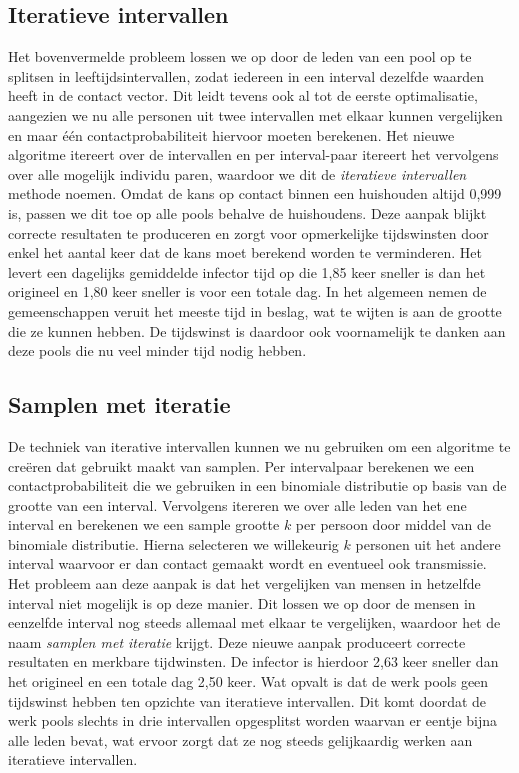 \begin{appendices}
\subsection{Iteratieve intervallen}
Het bovenvermelde probleem lossen we op door de leden van een pool op te splitsen in leeftijdsintervallen, zodat iedereen in een interval dezelfde waarden heeft in de contact vector. Dit leidt tevens ook al tot de eerste optimalisatie, aangezien we nu alle personen uit twee intervallen met elkaar kunnen vergelijken en maar één contactprobabiliteit hiervoor moeten berekenen. Het nieuwe algoritme itereert over de intervallen en per interval-paar itereert het vervolgens over alle mogelijk individu paren, waardoor we dit de \textit{iteratieve intervallen} methode noemen. Omdat de kans op contact binnen een huishouden altijd 0,999 is, passen we dit toe op alle pools behalve de huishoudens. Deze aanpak blijkt correcte resultaten te produceren en zorgt voor opmerkelijke tijdswinsten door enkel het aantal keer dat de kans moet berekend worden te verminderen. Het levert een dagelijks gemiddelde infector tijd op die 1,85 keer sneller is dan het origineel en 1,80 keer sneller is voor een totale dag. In het algemeen nemen de gemeenschappen veruit het meeste tijd in beslag, wat te wijten is aan de grootte die ze kunnen hebben. De tijdswinst is daardoor ook voornamelijk te danken aan deze pools die nu veel minder tijd nodig hebben.

\subsection{Samplen met iteratie}
De techniek van iterative intervallen kunnen we nu gebruiken om een algoritme te creëren dat gebruikt maakt van samplen. Per intervalpaar berekenen we een contactprobabiliteit die we gebruiken in een binomiale distributie op basis van de grootte van een interval. Vervolgens itereren we over alle leden van het ene interval en berekenen we een sample grootte $k$ per persoon door middel van de binomiale distributie. Hierna selecteren we willekeurig $k$ personen uit het andere interval waarvoor er dan contact gemaakt wordt en eventueel ook transmissie. Het probleem aan deze aanpak is dat het vergelijken van mensen in hetzelfde interval niet mogelijk is op deze manier. Dit lossen we op door de mensen in eenzelfde interval nog steeds allemaal met elkaar te vergelijken, waardoor het de naam \textit{samplen met iteratie} krijgt. Deze nieuwe aanpak produceert correcte resultaten en merkbare tijdwinsten. De infector is hierdoor 2,63 keer sneller dan het origineel en een totale dag 2,50 keer. Wat opvalt is dat de werk pools geen tijdswinst hebben ten opzichte van iteratieve intervallen. Dit komt doordat de werk pools slechts in drie intervallen opgesplitst worden waarvan er eentje bijna alle leden bevat, wat ervoor zorgt dat ze nog steeds gelijkaardig werken aan iteratieve intervallen.


\end{appendices}
